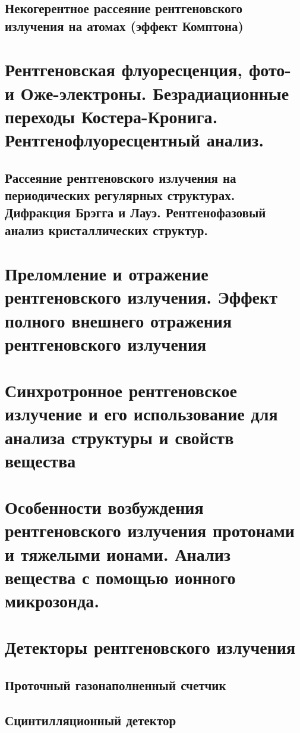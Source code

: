 \documentclass[a4paper,14pt, openany, twoside, draft]{extbook} %
\begin{document}
\section{Некогерентное рассеяние рентгеновского излучения на атомах (эффект Комптона)}

\chapter{Рентгеновская флуоресценция, фото- и Оже-электроны. Безрадиационные переходы Костера-Кронига. Рентгенофлуоресцентный анализ.}
\label{cha:xray-analisys}

\section{Рассеяние рентгеновского излучения на периодических регулярных структурах. Дифракция Брэгга и Лауэ. Рентгенофазовый анализ кристаллических структур.}
\label{sec:bragg-diffraction}

\chapter{Преломление и отражение рентгеновского излучения. Эффект полного внешнего отражения рентгеновского излучения}
\label{cha:total-reflection}

\chapter{Синхротронное рентгеновское излучение и его использование для анализа структуры и свойств вещества}
\label{cha:syncrotron}

\chapter{Особенности возбуждения рентгеновского излучения протонами и тяжелыми ионами. Анализ вещества с помощью ионного микрозонда.}
\label{cha:ion-micro}

\chapter{Детекторы рентгеновского излучения}
\label{cha:detectors}

\section{Проточный газонаполненный счетчик}
\section{Сцинтилляционный детектор}
\end{document}
